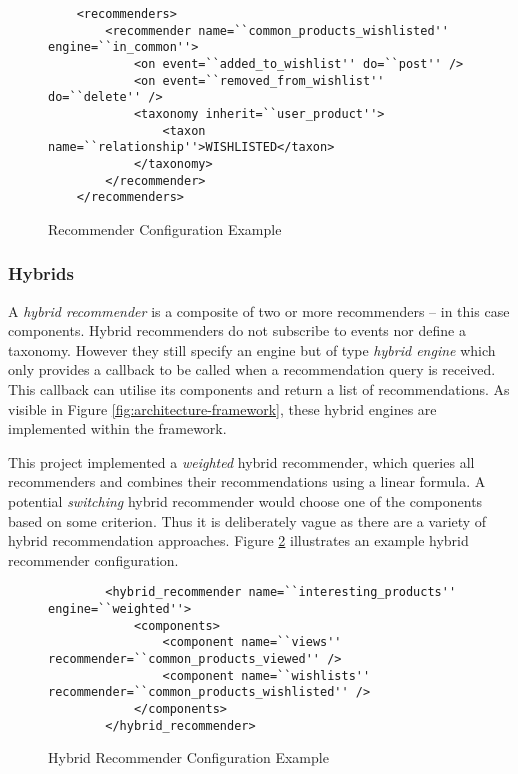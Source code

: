 \begin{figure}[ht]
    \begin{verbatim}
    <recommenders>
        <recommender name=``common_products_wishlisted'' engine=``in_common''>
            <on event=``added_to_wishlist'' do=``post'' />
            <on event=``removed_from_wishlist'' do=``delete'' />
            <taxonomy inherit=``user_product''>
                <taxon name=``relationship''>WISHLISTED</taxon>
            </taxonomy>
        </recommender>
    </recommenders>
    \end{verbatim}
    \caption{Recommender Configuration Example}
    \label{fig:architecture-framework-recommender}
\end{figure}

\subsubsection{Hybrids}

A \emph{hybrid recommender} is a composite of two or more recommenders -- in this case components. Hybrid recommenders do not subscribe to events nor define a taxonomy. However they still specify an engine but of type \emph{hybrid engine} which only provides a callback to be called when a recommendation query is received. This callback can utilise its components and return a list of recommendations. As visible in Figure \ref{fig:architecture-framework}, these hybrid engines are implemented within the framework.

This project implemented a \emph{weighted} hybrid recommender, which queries all recommenders and combines their recommendations using a linear formula. A potential \emph{switching} hybrid recommender would choose one of the components based on some criterion. Thus it is deliberately vague as there are a variety of hybrid recommendation approaches. Figure \ref{fig:architecture-framework-hybrid-recommender} illustrates an example hybrid recommender configuration.

\begin{figure}[ht]
    \begin{verbatim}
        <hybrid_recommender name=``interesting_products'' engine=``weighted''>
            <components>
                <component name=``views'' recommender=``common_products_viewed'' />
                <component name=``wishlists'' recommender=``common_products_wishlisted'' />
            </components>
        </hybrid_recommender>
    \end{verbatim}
    \caption{Hybrid Recommender Configuration Example}
    \label{fig:architecture-framework-hybrid-recommender}
\end{figure}

